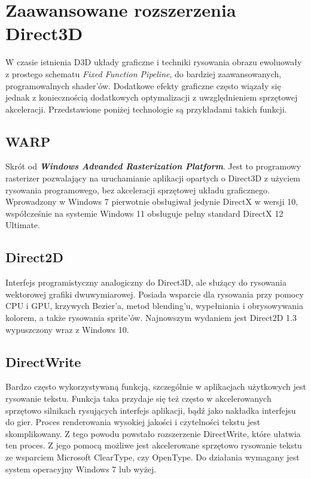 \section{Zaawansowane rozszerzenia Direct3D} %

W czasie istnienia D3D układy graficzne i techniki rysowania obrazu
ewoluowały z prostego schematu \emph{Fixed Function Pipeline}, do
bardziej zaawansowanych, programowalnych shader'ów. Dodatkowe efekty
graficzne często wiązały się jednak z koniecznością dodatkowych
optymalizacji z uwzględnieniem sprzętowej akceleracji. Przedstawione
poniżej technologie są przykładami takich funkcji.

\subsection{WARP}
Skrót od \emph{\textbf{Windows Advanded Rasterization Platform}}. Jest
to programowy rasterizer pozwalający na uruchamianie aplikacji opartych
o Direct3D z użyciem rysowania programowego, bez akceleracji sprzętowej
układu graficznego. Wprowadzony w Windows 7 pierwotnie obsługiwał jedynie DirectX w wersji
10, współcześnie na systemie Windows 11 obsługuje pełny standard DirectX
12 Ultimate.

\subsection{Direct2D}
Interfejs programistyczny analogiczny do Direct3D, ale służący do
rysowania wektorowej grafiki dwuwymiarowej. Posiada wsparcie dla
rysowania przy pomocy CPU i GPU, krzywych Bezier'a, metod blending'u,
wypełniania i obrysowywania kolorem, a także rysowania sprite'ów. Najnowszym wydaniem jest Direct2D 1.3 wypuszczony wraz z Windows 10.

\subsection{DirectWrite}
Bardzo często wykorzystywaną funkcją, szczególnie w aplikacjach
użytkowych jest rysowanie tekstu. Funkcja taka przydaje się też często w
akcelerowanych sprzętowo silnikach rysujących interfejs aplikacji, bądź
jako nakładka interfejsu do gier. Proces renderowania wysokiej jakości i czytelności tekstu jest
skomplikowany. Z tego powodu powstało rozszerzenie DirectWrite, które
ułatwia ten proces. Z jego pomocą możliwe jest akcelerowane sprzętowo
rysowanie tekstu ze wsparciem Microsoft ClearType, czy OpenType. Do
działania wymagany jest system operacyjny Windows 7 lub wyżej.

